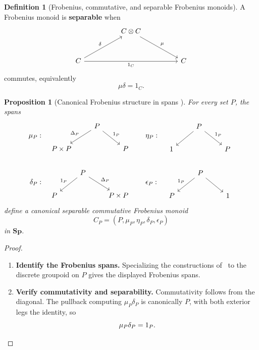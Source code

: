 \documentclass[oneside]{article}
\newcommand{\Sp}{\mathbf{Sp}}
\theoremstyle{plain}
\newtheorem{proposition}[theorem]{Proposition}
\theoremstyle{definition}
\newtheorem{definition}[theorem]{Definition}
\theoremstyle{remark}
\begin{document}
\begin{definition}[Frobenius, commutative, and separable Frobenius monoids]
    A Frobenius monoid is \textbf{separable} when
    \begin{equation}
        \begin{tikzcd}[column sep=huge, row sep=large]
            & C \otimes C \ar[dr, "\mu"] & \\
            C \ar[rr, "1_C"'] \ar[ur, "\delta"] && C
        \end{tikzcd}
    \label{eq:cgqg-background-frobenius-separable}
    \end{equation}
    commutes, equivalently
    \[
        \mu\delta=1_C.
    \]
\end{definition}

\begin{proposition}[Canonical Frobenius structure in spans
{\cite[Examples~3.7 and 4.8]{ContrerasKellerMehta2022}}]
\label{prop:cgqg-background-frobenius-base}
    For every set \(P\), the spans
    \[
    \begin{aligned}
    \mu_P:\quad
    &\begin{tikzcd}
        & P \arrow[dl, "\Delta_P"'] \arrow[dr, "1_P"] & \\
        P\times P & & P
    \end{tikzcd}
    \qquad
    \eta_P:\quad
    \begin{tikzcd}
        & P \arrow[dl] \arrow[dr, "1_P"] & \\
        1 & & P
    \end{tikzcd}
    \\[1.5em]
    \delta_P:\quad
    &\begin{tikzcd}
        & P \arrow[dl, "1_P"'] \arrow[dr, "\Delta_P"] & \\
        P & & P\times P
    \end{tikzcd}
    \qquad
    \epsilon_P:\quad
    \begin{tikzcd}
        & P \arrow[dl, "1_P"'] \arrow[dr] & \\
        P & & 1
    \end{tikzcd}
    \end{aligned}
    \]
    define a canonical separable commutative Frobenius monoid
    \[
        C_P=(P,\mu_P,\eta_P,\delta_P,\epsilon_P)
    \]
    in \(\Sp\).
\end{proposition}
\begin{proof}
    \leavevmode
    \begin{enumerate}[beginpenalty=10000]
        \item \textbf{Identify the Frobenius spans.} Specializing the constructions of~\cite[Examples~3.7 and 4.8]{ContrerasKellerMehta2022} to the discrete groupoid on \(P\) gives the displayed Frobenius spans.

        \item \textbf{Verify commutativity and separability.} Commutativity follows from the diagonal. The pullback computing \(\mu_P\delta_P\) is canonically \(P\), with both exterior legs the identity, so
        \[
            \mu_P\delta_P=1_P.\qedhere
        \]
    \end{enumerate}
\end{proof}
\end{document}
